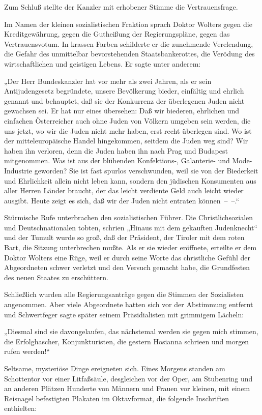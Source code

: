 Zum Schluß stellte der Kanzler mit erhobener Stimme die
Vertrauensfrage.

Im Namen der kleinen sozialistischen Fraktion sprach Doktor Wolters
gegen die Kreditgewährung, gegen die Gutheißung der
Regierungspläne, gegen das Vertrauensvotum. In krassen Farben
schilderte er die zunehmende Verelendung, die Gefahr des
unmittelbar bevorstehenden Staatsbankerottes, die Verödung des
wirtschaftlichen und geistigen Lebens. Er sagte unter anderem:

„Der Herr Bundeskanzler hat vor mehr als zwei Jahren, als er sein
Antijudengesetz begründete, unsere Bevölkerung bieder, einfältig
und ehrlich genannt und behauptet, daß sie der Konkurrenz der
überlegenen Juden nicht gewachsen sei. Er hat nur eines übersehen:
Daß wir biederen, ehrlichen und einfachen Österreicher auch ohne
Juden von Völkern umgeben sein werden, die uns jetzt, wo wir die
Juden nicht mehr haben, erst recht überlegen sind. Wo ist der
mitteleuropäische Handel hingekommen, seitdem die Juden weg sind?
Wir haben ihn verloren, denn die Juden haben ihn nach Prag und
Budapest mitgenommen.  Was ist aus der blühenden
Konfektions-, Galanterie- und Mode-Industrie geworden? Sie ist fast
spurlos verschwunden, weil sie von der Biederkeit und Ehrlichkeit
allein nicht leben kann, sondern den jüdischen Konsumenten aus
aller Herren Länder braucht, der das leicht verdiente Geld auch
leicht wieder ausgibt. Heute zeigt es sich, daß wir der Juden nicht
entraten können~–~–.“

Stürmische Rufe unterbrachen den sozialistischen Führer. Die
Christlichsozialen und Deutschnationalen tobten, schrien „Hinaus
mit dem gekauften Judenknecht“ und der Tumult wurde so groß, daß
der Präsident, der Tiroler mit dem roten Bart, die Sitzung
unterbrechen mußte. Als er sie wieder eröffnete, erteilte er dem
Doktor Wolters eine Rüge, weil er durch seine Worte das christliche
Gefühl der Abgeordneten schwer verletzt und den Versuch gemacht
habe, die Grundfesten des neuen Staates zu erschüttern.

Schließlich wurden alle Regierungsanträge gegen die Stimmen der
Sozialisten angenommen. Aber viele Abgeordnete hatten sich vor der
Abstimmung entfernt und Schwertfeger sagte später seinem
Präsidialisten mit grimmigem Lächeln:

„Diesmal sind sie davongelaufen, das nächstemal werden sie gegen
mich stimmen, die Erfolghascher, Konjunkturisten, die gestern
Hosianna schrieen und morgen  rufen werden!“

\tb{* * *}
Seltsame, mysteriöse Dinge ereigneten sich. Eines
Morgens standen am Schottentor vor einer Litfaßsäule, desgleichen
vor der Oper, am Stubenring und an anderen Plätzen Hunderte von
Männern und Frauen vor kleinen, mit einem Reisnagel befestigten
Plakaten im Oktavformat, die folgende Inschriften enthielten:

